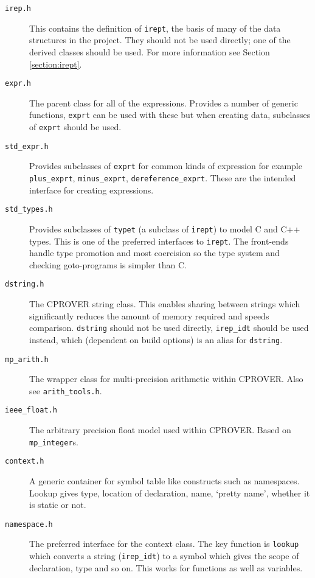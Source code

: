 \documentclass{article}
\newcommand{\file}[1]{\texttt{#1}}
\newcommand{\code}[1]{\texttt{#1}}
\begin{document}
\begin{description}
  \item[\file{irep.h}]{This contains the definition of \code{irept},
    the basis of many of the data structures in the project.  They
    should not be used directly; one of the derived classes should be
    used.  For more information see Section \ref{section:irept}.}
  \item[\file{expr.h}]{The parent class for all of the expressions.
    Provides a number of generic functions, \code{exprt} can be used
    with these but when creating data, subclasses of \code{exprt}
    should be used.}
  \item[\file{std\_expr.h}]{Provides subclasses of \code{exprt} for
    common kinds of expression for example \code{plus\_exprt},
    \code{minus\_exprt}, \code{dereference\_exprt}.  These are the
    intended interface for creating expressions.}
  \item[\file{std\_types.h}]{Provides subclasses of \code{typet} (a
    subclass of \code{irept}) to model C and C++ types.  This is one
    of the preferred interfaces to \code{irept}.  The front-ends handle
    type promotion and most coercision so the type system and checking
    goto-programs is simpler than C.}
  \item[\file{dstring.h}]{The CPROVER string class.  This enables
    sharing between strings which significantly reduces the amount of
    memory required and speeds comparison.  \code{dstring} should not
    be used directly, \code{irep\_idt} should be used instead, which
    (dependent on build options) is an alias for \code{dstring}.}
  \item[\file{mp\_arith.h}]{The wrapper class for multi-precision
    arithmetic within CPROVER.  Also see \file{arith\_tools.h}.}
  \item[\file{ieee\_float.h}]{The arbitrary precision float model used
    within CPROVER.  Based on \code{mp\_integer}s.}
  \item[\file{context.h}]{A generic container for symbol table like
    constructs such as namespaces.  Lookup gives type, location of
    declaration, name, `pretty name', whether it is static or not.}
  \item[\file{namespace.h}]{The preferred interface for the context
    class.  The key function is \code{lookup} which converts a string
    (\code{irep\_idt}) to a symbol which gives the scope of
    declaration, type and so on.  This works for functions as well as variables.}
\end{description}
\end{document}
